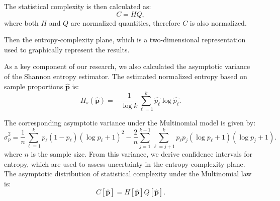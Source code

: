 The statistical complexity is then calculated as:
\begin{equation}
	C=HQ,
\end{equation}
where both $H$ and $Q$ are normalized quantities, therefore $C$ is also normalized.   

Then the entropy-complexity plane, which is a two-dimensional representation used to graphically represent the results. 

As a key component of our research, we also calculated the asymptotic variance of the Shannon entropy estimator. The estimated normalized entropy based on sample proportions $\widehat{\bm{p}}$ is: 
\begin{equation}
	H_s(\widehat{\bm{p}})=-\dfrac{1}{\log k}\sum_{\ell=1}^{k}\widehat{p_\ell}\log\widehat{p_\ell}.
\end{equation}

The corresponding asymptotic variance under the Multinomial model is given by:
\begin{equation}
	\widehat{\sigma}^2_p=\dfrac{1}{n}\sum_{\ell=1}^{k}p_\ell(1-p_\ell)(\log p_\ell+1)^2-\dfrac{2}{n}\sum_{j=1}^{k-1}\sum_{\ell=j+1}^{k}p_\ell p_j(\log p_\ell+1)(\log p_j+1).
\end{equation}
where $n$ is the sample size. From this variance, we derive confidence intervals for entropy, which are used to assess uncertainty in the entropy-complexity plane. The asymptotic distribution of statistical complexity under the Multinomial law is:
\begin{equation}
		C[\widehat{\bm{p}}]=H[\widehat{\bm{p}}]Q[\widehat{\bm{p}}].
\end{equation}



